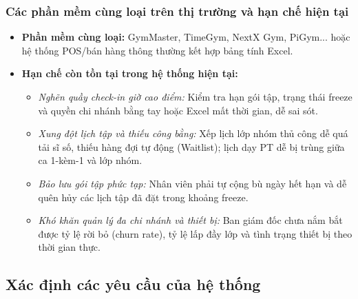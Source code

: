 \documentclass[a4paper,12pt]{article}
\begin{document}
\subsubsection{Các phần mềm cùng loại trên thị trường và hạn chế hiện tại}
\begin{itemize}
    \item \textbf{Phần mềm cùng loại:} GymMaster, TimeGym, NextX Gym, PiGym... hoặc hệ thống POS/bán hàng thông thường kết hợp bảng tính Excel.
    \item \textbf{Hạn chế còn tồn tại trong hệ thống hiện tại:}
    \begin{itemize}
        \item \textit{Nghẽn quầy check-in giờ cao điểm:} Kiểm tra hạn gói tập, trạng thái freeze và quyền chi nhánh bằng tay hoặc Excel mất thời gian, dễ sai sót.
        \item \textit{Xung đột lịch tập và thiếu công bằng:} Xếp lịch lớp nhóm thủ công dễ quá tải sĩ số, thiếu hàng đợi tự động (Waitlist); lịch dạy PT dễ bị trùng giữa ca 1-kèm-1 và lớp nhóm.
        \item \textit{Bảo lưu gói tập phức tạp:} Nhân viên phải tự cộng bù ngày hết hạn và dễ quên hủy các lịch tập đã đặt trong khoảng freeze.
        \item \textit{Khó khăn quản lý đa chi nhánh và thiết bị:} Ban giám đốc chưa nắm bắt được tỷ lệ rời bỏ (churn rate), tỷ lệ lấp đầy lớp và tình trạng thiết bị theo thời gian thực.
    \end{itemize}
\end{itemize}

\subsection{Xác định các yêu cầu của hệ thống}
\end{document}

